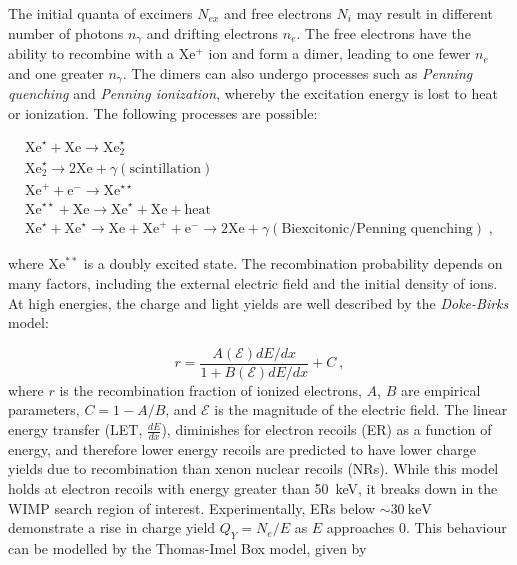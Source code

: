 The initial quanta of excimers $N_{ex}$ and free electrons $N_i$ may result in different number of photons $n_\gamma$ and drifting electrons $n_e$.
The free electrons have the ability to recombine with a Xe$^+$ ion and form a dimer, leading to one fewer $n_e$ and one greater $n_\gamma$.
The dimers can also undergo processes such as \textit{Penning quenching} and \textit{Penning ionization}, whereby the excitation energy is lost to heat or ionization.
The following processes are possible:

\begin{align}
    \text{Xe}^\star + \text{Xe} \rightarrow \text{Xe}_2^\star\\
    \text{Xe}_2^\star \rightarrow 2 \text{Xe} + \gamma (\text{scintillation})\\
     \text{Xe}^+ + \text{e}^- \rightarrow \text{Xe}^{\star \star}\\
    \text{Xe}^{\star \star} + \text{Xe} \rightarrow \text{Xe}^\star  + \mathrm{Xe} + \text{heat}\\
      \text{Xe}^\star + \text{Xe}^\star  \rightarrow \text{Xe} + \text{Xe}^+ + \text{e}^- \rightarrow 2 \text{Xe} + \gamma(\text{Biexcitonic/Penning quenching}) \;,
\end{align}

where Xe$^{**}$ is a doubly excited state.
The recombination probability depends on many factors, including the external electric field and the initial density of ions.
At high energies, the charge and light yields are well described by the \textit{Doke-Birks} model\cite{doke_absolute_2002}:

\begin{equation}
r = \frac{A(\mathcal{E}) dE/dx }{1 + B(\mathcal{E}) dE/dx} +C~,
    \label{eq:dokebirks}
\end{equation}
\noindent
where $r$ is the recombination fraction of ionized electrons, $A$, $B$ are empirical parameters, $C=1-A/B$, and $\mathcal{E}$ is the magnitude of the electric field. 
The linear energy transfer (LET, $\frac{dE}{dx}$), diminishes for electron recoils (ER) as a function of energy, and therefore lower energy recoils are predicted to have lower charge yields due to recombination than xenon nuclear recoils (NRs).
While this model holds at electron recoils with energy greater than 50~keV, it breaks down in the WIMP search region of interest.
Experimentally, ERs below $\sim 30 \mathrm{~keV}$ demonstrate a rise in charge yield $Q_Y = N_e/E$ as $E$ approaches 0.
This behaviour can be modelled by the Thomas-Imel Box model\cite{sorensen_nuclear_2011, thomas_recombination_1987}, given by

